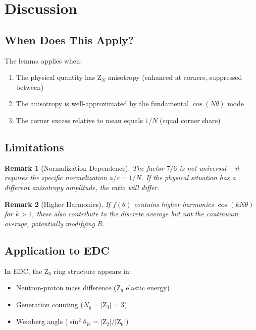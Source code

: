 \documentclass[11pt]{article}
\newtheorem{remark}{Remark}
\begin{document}
\section{Discussion}

\subsection{When Does This Apply?}

The lemma applies when:
\begin{enumerate}
\item The physical quantity has Z$_N$ anisotropy (enhanced at corners, suppressed between)
\item The anisotropy is well-approximated by the fundamental $\cos(N\theta)$ mode
\item The corner excess relative to mean equals $1/N$ (equal corner share)
\end{enumerate}

\subsection{Limitations}

\begin{remark}[Normalization Dependence]
The factor $7/6$ is \emph{not universal} -- it requires the specific normalization $a/c = 1/N$. If the physical situation has a different anisotropy amplitude, the ratio will differ.
\end{remark}

\begin{remark}[Higher Harmonics]
If $f(\theta)$ contains higher harmonics $\cos(kN\theta)$ for $k > 1$, these also contribute to the discrete average but not the continuum average, potentially modifying $R$.
\end{remark}

\subsection{Application to EDC}

In EDC, the Z$_6$ ring structure appears in:
\begin{itemize}
\item Neutron-proton mass difference (Z$_6$ elastic energy)
\item Generation counting ($N_g = |$Z$_3| = 3$)
\item Weinberg angle ($\sin^2\theta_W = |$Z$_2|/|$Z$_6|$)
\end{itemize}
\end{document}
